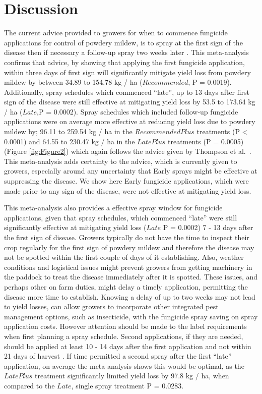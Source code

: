 \documentclass[agronomy,article,submit,moreauthors,pdftex]{mdpi}
\begin{document}
\hypertarget{discussion}{%
\section{Discussion}\label{discussion}}

The current advice provided to growers for when to commence fungicide applications for control of powdery mildew, is to spray at the first sign of the disease then if necessary a follow-up spray two weeks later \citep{SueThompson2016, Sparks2017}.
This meta-analysis confirms that advice, by showing that applying the first fungicide application, within three days of first sign will significantly mitigate yield loss from powdery mildew by between 34.89 to 154.78 kg / ha (\(Recommended\), P = 0.0019).
Additionally, spray schedules which commenced ``late'', up to 13 days after first sign of the disease were still effective at mitigating yield loss by 53.5 to 173.64 kg / ha (\(Late\),P = 0.0002).
Spray schedules which included follow-up fungicide applications were on average more effective at reducing yield loss due to powdery mildew by;
96.11 to 259.54 kg / ha in the \(RecommendedPlus\) treatments (P \textless{} 0.0001) and
64.55 to 230.47 kg / ha in the \(LatePlus\) treatments (P = 0.0005) (Figure \ref{fig:Figure2})
which again follows the advice given by Thompson et al.~\citep{SueThompson2016}.
This meta-analysis adds certainty to the advice, which is currently given to growers, especially around any uncertainty that Early sprays might be effective at suppressing the disease.
We show here Early fungicide applications, which were made prior to any sign of the disease, were not effective at mitigating yield loss.

This meta-analysis also provides a effective spray window for fungicide applications, given that spray schedules, which commenced ``late'' were still significantly effective at mitigating yield loss (\(Late\) P = 0.0002) 7 - 13 days after the first sign of disease.
Growers typically do not have the time to inspect their crop regularly for the first sign of powdery mildew and therefore the disease may not be spotted within the first couple of days of it establishing.
Also, weather conditions and logistical issues might prevent growers from getting machinery in the paddock to treat the disease immediately after it is spotted.
These issues, and perhaps other on farm duties, might delay a timely application, permitting the disease more time to establish.
Knowing a delay of up to two weeks may not lead to yield losses, can allow growers to incorporate other integrated pest management options, such as insecticide, with the fungicide spray saving on spray application costs.
However attention should be made to the label requirements when first planning a spray schedule.
Second applications, if they are needed, should be applied at least 10 - 14 days after the first application and not within 21 days of harvest \citep{APVMAcustodia}.
If time permitted a second spray after the first ``late'' application, on average the meta-analysis shows this would be optimal, as the \(LatePlus\) treatment significantly limited yield loss by 97.8 kg / ha, when compared to the \(Late\), single spray treatment P = 0.0283.
\end{document}
